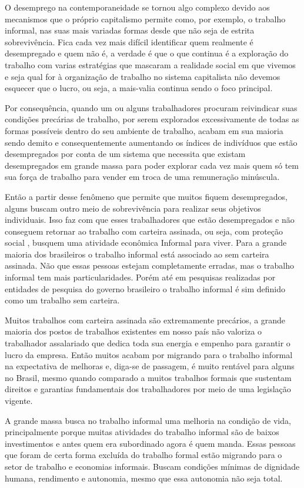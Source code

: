 O desemprego na contemporaneidade se tornou algo complexo devido aos mecanismos que o próprio 
capitalismo permite como, por exemplo, o trabalho informal, nas suas mais variadas formas desde 
que não seja de estrita sobrevivência. Fica cada vez mais difícil identificar quem realmente é 
desempregado e quem não é, a verdade é que o que continua é a exploração do trabalho com varias 
estratégias que mascaram a realidade social em que vivemos e seja qual for à organização de 
trabalho no sistema capitalista não devemos esquecer que o lucro, ou seja, a mais-valia continua 
sendo o foco principal. 

Por consequência, quando um ou alguns trabalhadores procuram reivindicar suas condições precárias de trabalho, por serem explorados excessivamente de todas as formas possíveis dentro do seu ambiente de trabalho, acabam em sua maioria sendo demito e consequentemente aumentando os índices de indivíduos que estão desempregados por conta de um sistema que necessita que existam desempregados em grande massa para poder explorar cada vez mais quem só tem sua força de trabalho para vender em troca de uma remuneração minúscula.

Então a partir desse fenômeno que permite que muitos fiquem desempregados, alguns buscam outro meio de sobrevivência para realizar seus objetivos individuais. Isso faz com que esses trabalhadores que estão desempregados e não conseguem retornar ao trabalho com carteira assinada, ou seja, com proteção social , busquem uma atividade econômica Informal para viver.
Para a grande maioria dos brasileiros o trabalho informal está associado ao sem carteira assinada. Não que essas pessoas estejam completamente erradas, mas o trabalho informal tem mais particularidades. Porém até em pesquisas realizadas por entidades de pesquisa do governo brasileiro o trabalho informal é sim definido como um trabalho sem carteira.

Muitos trabalhos com carteira assinada são extremamente precários, a grande maioria dos postos de trabalhos existentes em nosso país não valoriza o trabalhador assalariado que dedica toda sua energia e empenho para garantir o lucro da empresa. Então muitos acabam por migrando para o trabalho informal na expectativa de melhoras e, diga-se de passagem, é muito rentável para alguns no Brasil, mesmo quando comparado a muitos trabalhos formais que sustentam direitos e garantias fundamentais dos trabalhadores por meio de uma legislação vigente.

A grande massa busca no trabalho informal uma melhoria na condição de vida, principalmente porque muitas atividades do trabalho informal são de baixos investimentos e antes quem era subordinado agora é quem manda. Essas pessoas que foram de certa forma excluída do trabalho formal estão migrando para o setor de trabalho e economias informais. Buscam condições mínimas de dignidade humana, rendimento e autonomia, mesmo que essa autonomia não seja total.

